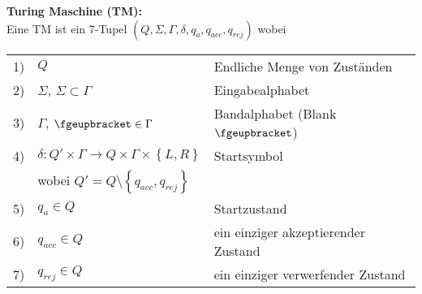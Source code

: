 \documentclass[
	final,
	a4paper,
	oneside,
	parskip=full,
	headings=standardclasses,
	headings=big,
	pointednumbers
]{scrartcl}
\begin{document}
    \textbf{Turing Maschine (TM):}\\
    Eine TM ist ein 7-Tupel $\left(Q,\Sigma, \Gamma, \delta, q_a, q_{acc}, q_{rej} \right)$ wobei \\
    \hspace{-0.3cm}
    \begin{tabular}{lll}
        1) & $Q$                                            & Endliche Menge von Zuständen \\
        2) & $\Sigma$, $\Sigma \subset \Gamma$              & Eingabealphabet \\
        3) & $\Gamma$, $\fgeupbracket \in \Gamma$           & Bandalphabet (Blank $\fgeupbracket$) \\
        4) & $\delta: Q' \times \Gamma \xrightarrow{\;\;} Q \times \Gamma \times \left\{ L, R \right\}$ & Startsymbol \\
           & wobei $Q' = Q \setminus \left\{ q_{acc}, q_{rej} \right\}$ & \\
        5) & $q_a \in Q$                                    & Startzustand \\
        6) & $q_{acc} \in Q$                                & ein einziger akzeptierender Zustand  \\
        7) & $q_{rej} \in Q$                                & ein einziger verwerfender Zustand \\
    \end{tabular}
\end{document}

